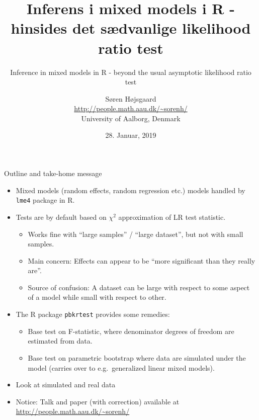 \documentclass[
  ignorenonframetext,
]{beamer}
\title{Inferens i mixed models i R - hinsides det sædvanlige likelihood ratio
test}
\subtitle{Inference in mixed models in R - beyond the usual asymptotic likelihood
ratio test}
\author{Søren Højsgaard\\
\url{http://people.math.aau.dk/~sorenh/}\\
University of Aalborg, Denmark}
\date{28. Januar, 2019}
\providecommand{\tightlist}{%
  \setlength{\itemsep}{0pt}\setlength{\parskip}{0pt}}
\begin{document}
\frame{\titlepage}

\begin{frame}[fragile]

\begin{block}{Outline and take-home message}

\begin{itemize}
\item
  Mixed models (random effects, random regression etc.) models handled
  by \texttt{lme4} package in R.
\item
  Tests are by default based on \(\chi^2\) approximation of LR test
  statistic.

  \begin{itemize}
  \item
    Works fine with ``large samples'' / ``large dataset'', but not with
    small samples.
  \item
    Main concern: Effects can appear to be ``more significant than they
    really are''.
  \item
    Source of confusion: A dataset can be large with respect to some
    aspect of a model while small with respect to other.
  \end{itemize}
\end{itemize}

\end{block}

\end{frame}

\begin{frame}[fragile]

\begin{itemize}
\item
  The R package \texttt{pbkrtest} provides some remedies:

  \begin{itemize}
  \tightlist
  \item
    Base test on F-statistic, where denominator degrees of freedom are
    estimated from data.
  \item
    Base test on parametric bootstrap where data are simulated under the
    model (carries over to e.g.~generalized linear mixed models).
  \end{itemize}
\item
  Look at simulated and real data
\item
  Notice: Talk and paper (with correction) available at
  \url{http://people.math.aau.dk/~sorenh/}
\end{itemize}

\end{frame}
\end{document}
